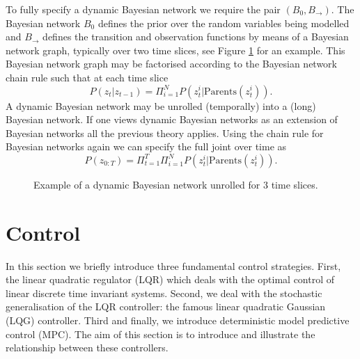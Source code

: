 To fully specify a dynamic Bayesian network we require the pair $(B_0, B_{\rightarrow})$. The Bayesian network $B_0$ defines the prior over the random variables being modelled and $B_{\rightarrow}$ defines the transition and observation functions by means of a Bayesian network graph, typically over two time slices, see Figure \ref{fig_gen_dbn} for an example. This Bayesian network graph may be factorised according to the Bayesian network chain rule such that at each time slice
\begin{equation}
P(z_t|z_{t-1}) = \Pi_{i=1}^{N}P(z_t^i| \text{Parents} (z^i_t)).
\end{equation}
A dynamic Bayesian network may be unrolled (temporally) into a (long) Bayesian network. If one views dynamic Bayesian networks as an extension of Bayesian networks all the previous theory applies. Using the chain rule for Bayesian networks again we can specify the full joint over time as
\begin{equation}
P(z_{0:T}) = \Pi_{t=1}^{T}\Pi_{i=1}^{N}P(z_t^i| \text{Parents} (z^i_t)).
\end{equation}
\begin{figure}[H] 
\centering
{}
\caption{Example of a dynamic Bayesian network unrolled for 3 time slices.}
\label{fig_gen_dbn}
\end{figure}
\section{Control}
\label{sec_lit_control}
In this section we briefly introduce three fundamental control strategies. First, the linear quadratic regulator (LQR) which deals with the optimal control of linear discrete time invariant systems. Second, we deal with the stochastic generalisation of the LQR controller: the famous linear quadratic Gaussian (LQG) controller. Third and finally, we introduce deterministic model predictive control (MPC). The aim of this section is to introduce and illustrate the relationship between these controllers.

